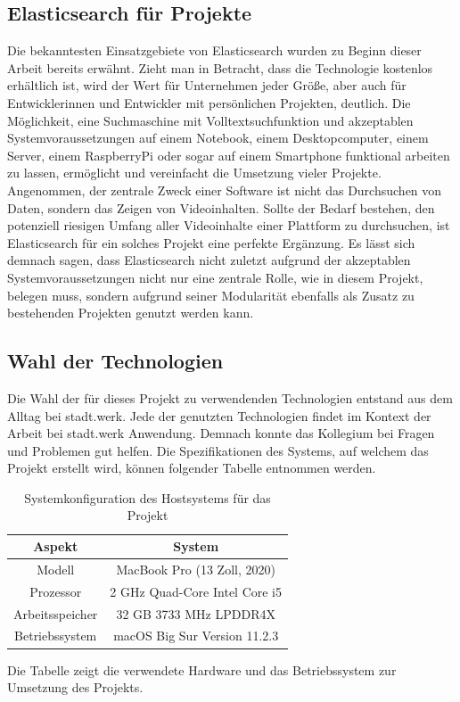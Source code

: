 \documentclass[a4paper]{scrartcl}
\begin{document}
\subsection{Elasticsearch für Projekte}
Die bekanntesten Einsatzgebiete von Elasticsearch wurden zu Beginn dieser Arbeit bereits erwähnt. Zieht man in Betracht, dass die Technologie kostenlos erhältlich ist, wird der Wert für Unternehmen jeder Größe, aber auch für Entwicklerinnen und Entwickler mit persönlichen Projekten, deutlich. Die Möglichkeit, eine Suchmaschine mit Volltextsuchfunktion und akzeptablen Systemvoraussetzungen auf einem Notebook, einem Desktopcomputer, einem Server, einem RaspberryPi oder sogar auf einem Smartphone funktional arbeiten zu lassen, ermöglicht und vereinfacht die Umsetzung vieler Projekte. Angenommen, der zentrale Zweck einer Software ist nicht das Durchsuchen von Daten, sondern das Zeigen von Videoinhalten. Sollte der Bedarf bestehen, den potenziell riesigen Umfang aller Videoinhalte einer Plattform zu durchsuchen, ist Elasticsearch für ein solches Projekt eine perfekte Ergänzung. Es lässt sich demnach sagen, dass Elasticsearch nicht zuletzt aufgrund der akzeptablen Systemvoraussetzungen nicht nur eine zentrale Rolle, wie in diesem Projekt, belegen muss, sondern aufgrund seiner Modularität ebenfalls als Zusatz zu bestehenden Projekten genutzt werden kann.

\subsection{Wahl der Technologien}
Die Wahl der für dieses Projekt zu verwendenden Technologien entstand aus dem Alltag bei stadt.werk. Jede der genutzten Technologien findet im Kontext der Arbeit bei stadt.werk Anwendung. Demnach konnte das Kollegium bei Fragen und Problemen gut helfen. Die Spezifikationen des Systems, auf welchem das Projekt erstellt wird, können folgender Tabelle entnommen werden.

\begin{table}[htb]
	\centering
	\caption{Systemkonfiguration des Hostsystems für das Projekt}
	\begin{center}
		
		\begin{tabular}{| c | c |}
			\hline
			Aspekt & System \\ [0.5ex]
			\hline \hline
			Modell & MacBook Pro (13 Zoll, 2020) \\
			\hline
			Prozessor & 2 GHz Quad-Core Intel Core i5 \\
			\hline
			Arbeitsspeicher & 32 GB 3733 MHz LPDDR4X \\
			\hline
			Betriebssystem & macOS Big Sur Version 11.2.3 \\
			\hline
		\end{tabular}
	\end{center}
	Die Tabelle zeigt die verwendete Hardware und das Betriebssystem zur Umsetzung des Projekts.
\end{table} 
\end{document}
